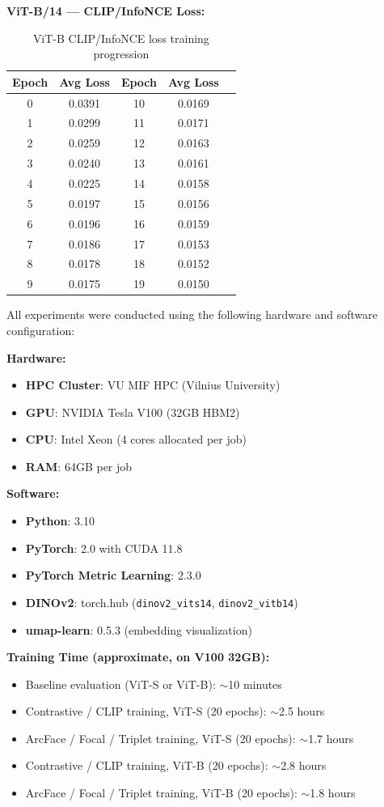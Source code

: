 \documentclass[
    english,
]{VUMIFPSbakalaurinis}
\begin{document}
\textbf{ViT-B/14 — CLIP/InfoNCE Loss:}
\begin{table}[H]
\centering
\small
\begin{tabular}{ccccc}
\toprule
\textbf{Epoch} & \textbf{Avg Loss} & \textbf{Epoch} & \textbf{Avg Loss} \\
\midrule
0 & 0.0391 & 10 & 0.0169 \\
1 & 0.0299 & 11 & 0.0171 \\
2 & 0.0259 & 12 & 0.0163 \\
3 & 0.0240 & 13 & 0.0161 \\
4 & 0.0225 & 14 & 0.0158 \\
5 & 0.0197 & 15 & 0.0156 \\
6 & 0.0196 & 16 & 0.0159 \\
7 & 0.0186 & 17 & 0.0153 \\
8 & 0.0178 & 18 & 0.0152 \\
9 & 0.0175 & 19 & 0.0150 \\
\bottomrule
\end{tabular}
\caption{ViT-B CLIP/InfoNCE loss training progression}
\end{table}


All experiments were conducted using the following hardware and software configuration:

\textbf{Hardware:}
\begin{itemize}
    \item \textbf{HPC Cluster}: VU MIF HPC (Vilnius University)
    \item \textbf{GPU}: NVIDIA Tesla V100 (32GB HBM2)
    \item \textbf{CPU}: Intel Xeon (4 cores allocated per job)
    \item \textbf{RAM}: 64GB per job
\end{itemize}

\textbf{Software:}
\begin{itemize}
    \item \textbf{Python}: 3.10
    \item \textbf{PyTorch}: 2.0 with CUDA 11.8
    \item \textbf{PyTorch Metric Learning}: 2.3.0
    \item \textbf{DINOv2}: torch.hub (\texttt{dinov2\_vits14}, \texttt{dinov2\_vitb14})
    \item \textbf{umap-learn}: 0.5.3 (embedding visualization)
\end{itemize}

\textbf{Training Time (approximate, on V100 32GB):}
\begin{itemize}
    \item Baseline evaluation (ViT-S or ViT-B): $\sim$10 minutes
    \item Contrastive / CLIP training, ViT-S (20 epochs): $\sim$2.5 hours
    \item ArcFace / Focal / Triplet training, ViT-S (20 epochs): $\sim$1.7 hours
    \item Contrastive / CLIP training, ViT-B (20 epochs): $\sim$2.8 hours
    \item ArcFace / Focal / Triplet training, ViT-B (20 epochs): $\sim$1.8 hours
\end{itemize}
\end{document}
